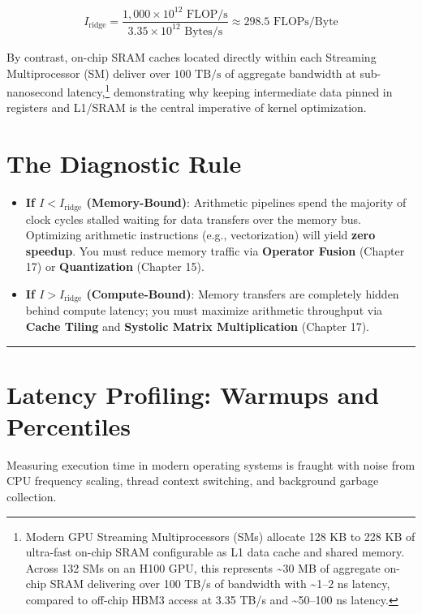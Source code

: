 \documentclass[
  letterpaper,
]{scrbook}
\providecommand{\tightlist}{%
  \setlength{\itemsep}{0pt}\setlength{\parskip}{0pt}}
\begin{document}
\[I_{\text{ridge}} = \frac{1{,}000 \times 10^{12}\text{ FLOP/s}}{3.35 \times 10^{12}\text{ Bytes/s}} \approx 298.5\text{ FLOPs/Byte}\]

By contrast, on-chip SRAM caches located directly within each Streaming
Multiprocessor (SM) deliver over \(100\text{ TB/s}\) of aggregate
bandwidth at sub-nanosecond latency,\footnote{Modern GPU Streaming
  Multiprocessors (SMs) allocate 128 KB to 228 KB of ultra-fast on-chip
  SRAM configurable as L1 data cache and shared memory. Across 132 SMs
  on an H100 GPU, this represents \textasciitilde30 MB of aggregate
  on-chip SRAM delivering over 100 TB/s of bandwidth with
  \textasciitilde1--2 ns latency, compared to off-chip HBM3 access at
  3.35 TB/s and \textasciitilde50--100 ns latency.} demonstrating why
keeping intermediate data pinned in registers and L1/SRAM is the central
imperative of kernel optimization.

\section{The Diagnostic Rule}\label{the-diagnostic-rule}

\begin{itemize}
\tightlist
\item
  \textbf{If \(I < I_{\text{ridge}}\) (Memory-Bound)}: Arithmetic
  pipelines spend the majority of clock cycles stalled waiting for data
  transfers over the memory bus. Optimizing arithmetic instructions
  (e.g., vectorization) will yield \textbf{zero speedup}. You must
  reduce memory traffic via \textbf{Operator Fusion} (Chapter 17) or
  \textbf{Quantization} (Chapter 15).
\item
  \textbf{If \(I > I_{\text{ridge}}\) (Compute-Bound)}: Memory transfers
  are completely hidden behind compute latency; you must maximize
  arithmetic throughput via \textbf{Cache Tiling} and \textbf{Systolic
  Matrix Multiplication} (Chapter 17).
\end{itemize}

\begin{center}\rule{0.5\linewidth}{0.5pt}\end{center}

\section{Latency Profiling: Warmups and
Percentiles}\label{latency-profiling-warmups-and-percentiles}

Measuring execution time in modern operating systems is fraught with
noise from CPU frequency scaling, thread context switching, and
background garbage collection.
\end{document}
